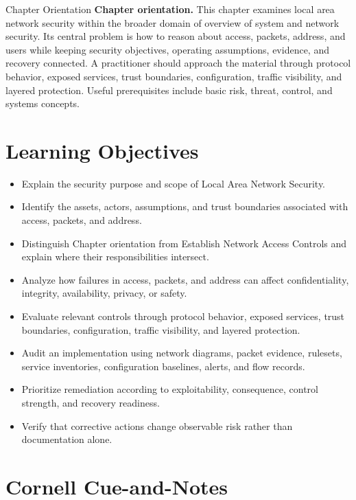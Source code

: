 \documentclass[11pt,letterpaper]{article}
\title{\CornellDocumentTitle}
\author{}
\date{}
\begin{document}
\maketitle
\begin{CornellOverviewBox}{Chapter Orientation}
\textbf{Chapter orientation.} This chapter examines local area network security within the broader domain of overview of system and network security. Its central problem is how to reason about access, packets, address, and users while keeping security objectives, operating assumptions, evidence, and recovery connected. A practitioner should approach the material through protocol behavior, exposed services, trust boundaries, configuration, traffic visibility, and layered protection. Useful prerequisites include basic risk, threat, control, and systems concepts.
\end{CornellOverviewBox}
\section*{Learning Objectives}
\begin{itemize}
\item Explain the security purpose and scope of Local Area Network Security.
\item Identify the assets, actors, assumptions, and trust boundaries associated with access, packets, and address.
\item Distinguish Chapter orientation from Establish Network Access Controls and explain where their responsibilities intersect.
\item Analyze how failures in access, packets, and address can affect confidentiality, integrity, availability, privacy, or safety.
\item Evaluate relevant controls through protocol behavior, exposed services, trust boundaries, configuration, traffic visibility, and layered protection.
\item Audit an implementation using network diagrams, packet evidence, rulesets, service inventories, configuration baselines, alerts, and flow records.
\item Prioritize remediation according to exploitability, consequence, control strength, and recovery readiness.
\item Verify that corrective actions change observable risk rather than documentation alone.
\end{itemize}
\section*{Cornell Cue-and-Notes}
\end{document}
